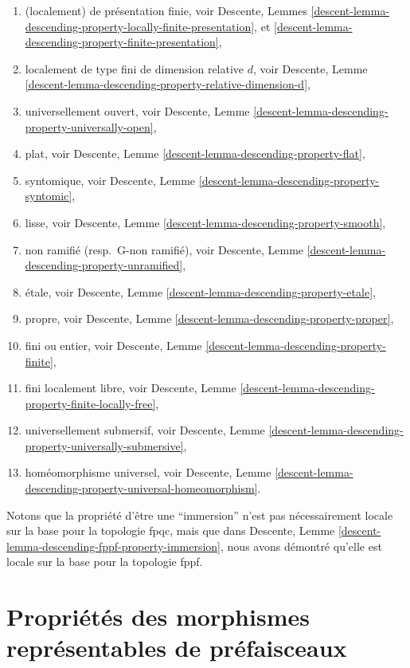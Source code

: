\begin{remark}
\begin{enumerate}
\item (localement) de présentation finie, voir
Descente, Lemmes
\ref{descent-lemma-descending-property-locally-finite-presentation}, et
\ref{descent-lemma-descending-property-finite-presentation},
\item localement de type fini de dimension relative $d$, voir
Descente,
Lemme \ref{descent-lemma-descending-property-relative-dimension-d},
\item universellement ouvert, voir
Descente, Lemme \ref{descent-lemma-descending-property-universally-open},
\item plat, voir
Descente, Lemme \ref{descent-lemma-descending-property-flat},
\item syntomique, voir
Descente, Lemme \ref{descent-lemma-descending-property-syntomic},
\item lisse, voir
Descente, Lemme \ref{descent-lemma-descending-property-smooth},
\item non ramifié (resp.\ G-non ramifié), voir
Descente, Lemme \ref{descent-lemma-descending-property-unramified},
\item \'etale, voir
Descente, Lemme \ref{descent-lemma-descending-property-etale},
\item propre, voir
Descente, Lemme \ref{descent-lemma-descending-property-proper},
\item fini ou entier, voir
Descente, Lemme \ref{descent-lemma-descending-property-finite},
\item fini localement libre, voir
Descente, Lemme \ref{descent-lemma-descending-property-finite-locally-free},
\item universellement submersif, voir
Descente, Lemme \ref{descent-lemma-descending-property-universally-submersive},
\item homéomorphisme universel, voir
Descente, Lemme \ref{descent-lemma-descending-property-universal-homeomorphism}.
\end{enumerate}
Notons que la propriété d'être une ``immersion'' n'est pas nécessairement locale
sur la base pour la topologie fpqc, mais que dans
Descente, Lemme \ref{descent-lemma-descending-fppf-property-immersion},
nous avons démontré qu'elle est locale sur la base pour la topologie fppf.
\end{remark}








\section{Propriétés des morphismes représentables de préfaisceaux}
\label{section-representable-properties}

